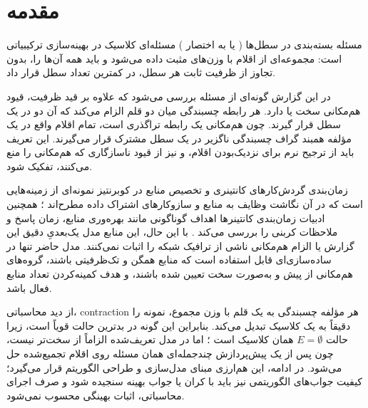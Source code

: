 \section{مقدمه}
مسئله بسته‌بندی در سطل‌ها ( یا به اختصار ) مسئله‌ای کلاسیک در بهینه‌سازی ترکیبیاتی است: مجموعه‌ای از اقلام با وزن‌های مثبت داده می‌شود و باید همه آن‌ها را، بدون تجاوز از ظرفیت ثابت هر سطل، در کمترین تعداد سطل قرار داد.

در این گزارش گونه‌ای از مسئله بررسی می‌شود که علاوه بر قید ظرفیت، قیود هم‌مکانی سخت یا  دارد. هر رابطه چسبندگی میان دو قلم الزام می‌کند که آن دو در یک سطل قرار گیرند. چون هم‌مکانی یک رابطه تراگذری است، تمام اقلام واقع در یک مؤلفه همبند گراف چسبندگی ناگزیر در یک سطل مشترک قرار می‌گیرند. این تعریف باید از ترجیح نرم برای نزدیک‌بودن اقلام، و نیز از قیود ناسازگاری که هم‌مکانی را منع می‌کنند، تفکیک شود.

زمان‌بندی گردش‌کارهای کانتینری و تخصیص منابع در کوبرنتیز نمونه‌ای از زمینه‌هایی است که در آن نگاشت وظایف به منابع و سازوکارهای اشتراک داده مطرح‌اند \cite{C1_Shan2022}؛ همچنین ادبیات زمان‌بندی کانتینرها اهداف گوناگونی مانند بهره‌وری منابع، زمان پاسخ و ملاحظات کربنی را بررسی می‌کند \cite{C4_Yang2025}. با این حال، این منابع مدل یک‌بعدیِ دقیق این گزارش یا الزام هم‌مکانی ناشی از ترافیک شبکه را اثبات نمی‌کنند. مدل حاضر تنها در ساده‌سازی‌ای قابل استفاده است که منابع همگن و تک‌ظرفیتی باشند، گروه‌های هم‌مکانی از پیش و به‌صورت سخت تعیین شده باشند، و هدف کمینه‌کردن تعداد منابع فعال باشد.

از دید محاسباتی، contraction هر مؤلفه چسبندگی به یک قلم با وزن مجموع، نمونه را دقیقاً به یک  کلاسیک تبدیل می‌کند. بنابراین این گونه در بدترین حالت قویاً  است، زیرا حالت $E=\emptyset$ همان  کلاسیک است \cite{GareyJohnson1979}؛ اما در مدل تعریف‌شده الزاماً از  سخت‌تر نیست، چون پس از یک پیش‌پردازش چندجمله‌ای همان مسئله روی اقلام تجمیع‌شده حل می‌شود. در ادامه، این هم‌ارزی مبنای مدل‌سازی و طراحی الگوریتم قرار می‌گیرد؛ کیفیت جواب‌های الگوریتمی نیز باید با کران یا جواب بهینه سنجیده شود و صرف اجرای محاسباتی، اثبات بهینگی محسوب نمی‌شود.
